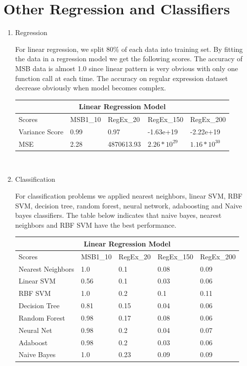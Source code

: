 \documentclass{article}
\begin{document}
\section{Other Regression and Classifiers}

\begin{enumerate}
    \item Regression

    For linear regression, we split 80\% of each data into training set. By fitting the data in a regression model we get the following scores. The accuracy of MSB data is almost 1.0 since linear pattern is very obvious with only one function call at each time. The accuracy on regular expression dataset decrease obviously when model becomes complex.

\begin{tabular}{ |p{2cm}||p{1.8cm}|p{1.8cm}|p{1.8cm}|p{1.8cm}| }
 \hline
 \multicolumn{5}{|c|}{Linear Regression Model} \\
 \hline
 Scores & MSB1\_10 & RegEx\_20 &RegEx\_150 & RegEx\_200\\
 \hline
 Variance Score   & 0.99 & 0.97 & -1.63e+19 & -2.22e+19\\
 MSE & 2.28 & 4870613.93 & $2.26*10^{29}$ & $1.16*10^{30}$\\
 \hline
\end{tabular}\\

    \item Classification

    For classification problems we applied nearest neighbors, linear SVM, RBF SVM, decision tree, random forest, neural network, adaboosting and Naive bayes classifiers. The table below indicates that naive bayes, nearest neighbors and RBF SVM have the best performance.

\begin{tabular}{ |p{2cm}||p{1.8cm}|p{1.8cm}|p{1.8cm}|p{1.8cm}| }
 \hline
 \multicolumn{5}{|c|}{Linear Regression Model} \\
 \hline
 Scores & MSB1\_10 & RegEx\_20 &RegEx\_150 & RegEx\_200\\
 \hline
 Nearest Neighbors   & 1.0 & 0.1 & 0.08 & 0.09\\
 Linear SVM & 0.56 & 0.1 & 0.03 & 0.06\\
 RBF SVM & 1.0 & 0.2 & 0.1 & 0.11\\
 Decision Tree & 0.81 & 0.15 & 0.04 & 0.06\\
 Random Forest & 0.98 & 0.17 & 0.08 & 0.06\\
 Neural Net & 0.98 & 0.2 & 0.04 & 0.07\\
 Adaboost & 0.98 & 0.2 & 0.03 & 0.06\\
 Naive Bayes & 1.0 & 0.23 & 0.09 & 0.09\\
 \hline
\end{tabular}\\


\end{enumerate}
\end{document}
